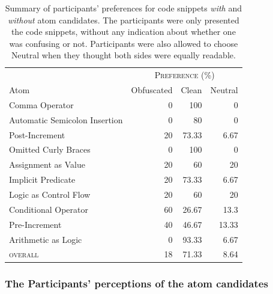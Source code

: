\begin{table}[!htb]
    \centering
    {\scriptsize
    \caption{Summary of participants' preferences for code snippets \emph{with} and
      \emph{without} atom candidates. The participants were only presented the code snippets, without any indication about whether one was confusing or not. 
      Participants were also allowed to choose Neutral when they thought both sides were equally readable.}\label{tab:interview-results1}
    \begin{tabular}{lrrr}\toprule
      & \multicolumn{3}{c}{\textsc{Preference (\%)}} \\
      \cmidrule(lr){2-4}
         Atom           & \multicolumn{1}{c}{Obfuscated}
                                      &  \multicolumn{1}{c}{Clean}
                                               & \multicolumn{1}{c}{Neutral} \\ \midrule
         Comma Operator                  & 0  & 100    & 0     \\
         Automatic Semicolon Insertion  & 0  & 80     & 0     \\
         Post-Increment                  & 20 & 73.33  & 6.67  \\
         Omitted Curly Braces            & 0  & 100    & 0     \\
         Assignment as Value             & 20 & 60     & 20    \\
         Implicit Predicate              & 20 & 73.33  & 6.67  \\
         Logic as Control Flow           & 20 & 60     & 20    \\
         Conditional Operator                & 60 & 26.67  & 13.3  \\
         Pre-Increment                   & 40 & 46.67  & 13.33 \\ 
         Arithmetic as Logic             & 0  & 93.33  & 6.67  \\ \midrule
         \textsc{overall}                & 18 & 71.33  & 8.64  \\
         \bottomrule
    \end{tabular}
    }

\end{table}

\subsubsection*{The Participants' perceptions of the atom candidates} 

